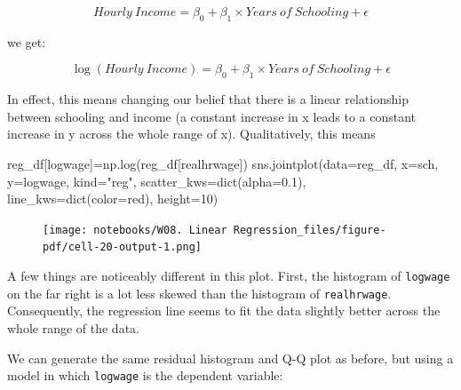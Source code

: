 \documentclass[
  letterpaper,
  DIV=11,
  numbers=noendperiod]{scrreprt}
\newenvironment{Shaded}{\begin{snugshade}}{\end{snugshade}}
\newcommand{\BuiltInTok}[1]{\textcolor[rgb]{0.00,0.23,0.31}{#1}}
\newcommand{\DecValTok}[1]{\textcolor[rgb]{0.68,0.00,0.00}{#1}}
\newcommand{\FloatTok}[1]{\textcolor[rgb]{0.68,0.00,0.00}{#1}}
\newcommand{\NormalTok}[1]{\textcolor[rgb]{0.00,0.23,0.31}{#1}}
\newcommand{\OperatorTok}[1]{\textcolor[rgb]{0.37,0.37,0.37}{#1}}
\newcommand{\StringTok}[1]{\textcolor[rgb]{0.13,0.47,0.30}{#1}}
\begin{document}
\[Hourly\ Income= \beta_0 + \beta_1 \times Years\ of\ Schooling +\epsilon \]

we get:

\[\log{(Hourly\ Income)}= \beta_0 + \beta_1 \times Years\ of\ Schooling +\epsilon \]

In effect, this means changing our belief that there is a linear
relationship between schooling and income (a constant increase in x
leads to a constant increase in y across the whole range of x).
Qualitatively, this means

\begin{Shaded}
\begin{Highlighting}[]
\NormalTok{reg\_df[}\StringTok{\textquotesingle{}logwage\textquotesingle{}}\NormalTok{]}\OperatorTok{=}\NormalTok{np.log(reg\_df[}\StringTok{\textquotesingle{}realhrwage\textquotesingle{}}\NormalTok{])}
\NormalTok{sns.jointplot(data}\OperatorTok{=}\NormalTok{reg\_df, x}\OperatorTok{=}\StringTok{\textquotesingle{}sch\textquotesingle{}}\NormalTok{, y}\OperatorTok{=}\StringTok{\textquotesingle{}logwage\textquotesingle{}}\NormalTok{, kind}\OperatorTok{=}\StringTok{"reg"}\NormalTok{,  scatter\_kws}\OperatorTok{=}\BuiltInTok{dict}\NormalTok{(alpha}\OperatorTok{=}\FloatTok{0.1}\NormalTok{), line\_kws}\OperatorTok{=}\BuiltInTok{dict}\NormalTok{(color}\OperatorTok{=}\StringTok{\textquotesingle{}red\textquotesingle{}}\NormalTok{), height}\OperatorTok{=}\DecValTok{10}\NormalTok{)}
\end{Highlighting}
\end{Shaded}

\begin{figure}[H]

{\centering \texttt{[image: notebooks/W08. Linear Regression\_files/figure-pdf/cell-20-output-1.png]}

}

\end{figure}

A few things are noticeably different in this plot. First, the histogram
of \texttt{logwage} on the far right is a lot less skewed than the
histogram of \texttt{realhrwage}. Consequently, the regression line
seems to fit the data slightly better across the whole range of the
data.

We can generate the same residual histogram and Q-Q plot as before, but
using a model in which \texttt{logwage} is the dependent variable:
\end{document}
